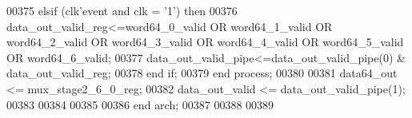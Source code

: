 \begin{DoxyCode}
00375       \textcolor{keywordflow}{elsif} \textcolor{vhdlchar}{(}\textcolor{vhdlchar}{clk}\textcolor{vhdlchar}{'}\textcolor{vhdlkeyword}{event} \textcolor{keywordflow}{and} \textcolor{vhdlchar}{clk} \textcolor{vhdlchar}{=} \textcolor{vhdlchar}{'}\textcolor{vhdllogic}{}\textcolor{vhdllogic}{1}\textcolor{vhdlchar}{'}\textcolor{vhdlchar}{)} \textcolor{keywordflow}{then}
00376             \textcolor{vhdlchar}{data_out_valid_reg}\textcolor{vhdlchar}{<=}\textcolor{vhdlchar}{word64_0_valid} \textcolor{keywordflow}{OR} \textcolor{vhdlchar}{word64_1_valid} \textcolor{keywordflow}{OR} \textcolor{vhdlchar}{
      word64_2_valid} \textcolor{keywordflow}{OR} \textcolor{vhdlchar}{word64_3_valid} \textcolor{keywordflow}{OR} \textcolor{vhdlchar}{word64_4_valid} \textcolor{keywordflow}{OR} \textcolor{vhdlchar}{word64_5_valid} \textcolor{keywordflow}{OR} \textcolor{vhdlchar}{
      word64_6_valid};
00377          \textcolor{vhdlchar}{data_out_valid_pipe}\textcolor{vhdlchar}{<=}\textcolor{vhdlchar}{data_out_valid_pipe}\textcolor{vhdlchar}{(}\textcolor{vhdllogic}{}\textcolor{vhdllogic}{0}\textcolor{vhdlchar}{)} \textcolor{vhdlchar}{&} \textcolor{vhdlchar}{data_out_valid_reg}; 
00378         \textcolor{keywordflow}{end} \textcolor{keywordflow}{if};
00379     \textcolor{keywordflow}{end} \textcolor{keywordflow}{process};
00380     
00381     \textcolor{vhdlchar}{data64_out}         \textcolor{vhdlchar}{<=} \textcolor{vhdlchar}{mux_stage2_6_0_reg};
00382     \textcolor{vhdlchar}{data_out_valid}   \textcolor{vhdlchar}{<=} \textcolor{vhdlchar}{data_out_valid_pipe}\textcolor{vhdlchar}{(}\textcolor{vhdllogic}{}\textcolor{vhdllogic}{1}\textcolor{vhdlchar}{)};
00383 
00384  
00385 
00386 \textcolor{keywordflow}{end} \textcolor{vhdlchar}{arch};   
00387 
00388 
00389 
\end{DoxyCode}
